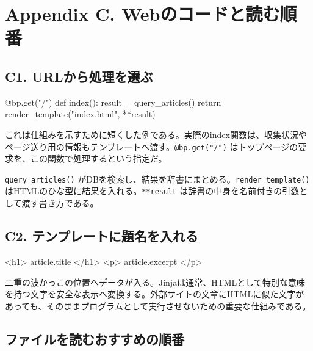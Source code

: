 \documentclass[a4paper,10pt]{ltjsarticle}
\begin{document}
\clearpage

\section*{Appendix C. Webのコードと読む順番}

\subsection*{C1. URLから処理を選ぶ}

\begin{Code}
@bp.get("/")
def index():
    result = query_articles()
    return render_template("index.html", **result)
\end{Code}

これは仕組みを示すために短くした例である。実際のindex関数は、収集状況やページ送り用の情報もテンプレートへ渡す。\nolinkurl{@bp.get("/")} はトップページの要求を、この関数で処理するという指定だ。


\nolinkurl{query_articles()} がDBを検索し、結果を辞書にまとめる。\nolinkurl{render_template()} はHTMLのひな型に結果を入れる。\nolinkurl{**result} は辞書の中身を名前付きの引数として渡す書き方である。


\subsection*{C2. テンプレートに題名を入れる}

\begin{Code}
<h1>{{ article.title }}</h1>
<p>{{ article.excerpt }}</p>
\end{Code}

二重の波かっこの位置へデータが入る。Jinjaは通常、HTMLとして特別な意味を持つ文字を安全な表示へ変換する。外部サイトの文章にHTMLに似た文字があっても、そのままプログラムとして実行させないための重要な仕組みである。


\subsection*{ファイルを読むおすすめの順番}
\end{document}
